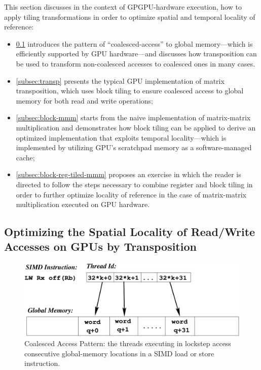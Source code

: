 \documentclass[acmsmall,review]{acmart}\settopmatter{printfolios=true,printccs=false,printacmref=false}
\begin{document}
This section discusses in the context of GPGPU-hardware execution,
how to apply tiling transformations in order to optimize spatial 
and temporal locality of reference:
\begin{itemize}
    \item \cref{subsec:coalesce} introduces the pattern of 
       ``coalesced-access'' to global memory---which is efficiently
       supported by GPU hardware---and discusses 
       how transposition can be used to transform non-coalesced 
        accesses to coalesced ones in many cases.
    \item \cref{subsec:transp} presents the typical GPU implementation 
        of matrix transposition, which uses block tiling to ensure 
        coalesced access to global memory for both read and write 
        operations;
    \item \cref{subsec:block-mmm} starts from the naive implementation 
        of matrix-matrix multiplication and demonstrates how block tiling 
        can be applied to derive an optimized implementation that
        exploits temporal locality---which is implemented by utilizing
        GPU's scratchpad memory as a software-managed cache;
    \item \cref{subsec:block-reg-tiled-mmm} proposes an exercise in
        which the reader is directed to follow the steps necessary
        to combine register and block tiling in order to further optimize
        locality of reference in the case of matrix-matrix multiplication
        executed on GPU hardware.
\end{itemize}

\subsection{Optimizing the Spatial Locality of Read/Write Accesses on GPUs by Transposition}
\label{subsec:coalesce}

\begin{figure}
\includegraphics[width=70ex]{Figures/L5/CoalescedGPU}
\caption{Coalesced Access Pattern: the threads executing in lockstep access consecutive global-memory locations in a SIMD load or store instruction.}
\label{fig:coal-gpu}
\end{figure} 
\end{document}

